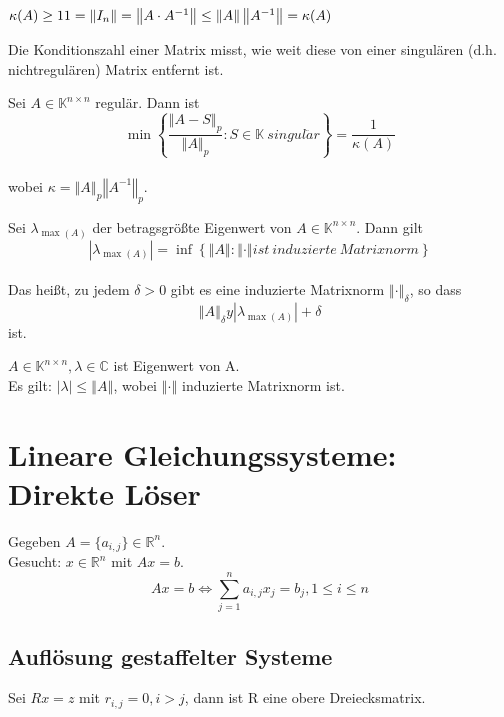 \documentclass[a4paper,10pt]{scrartcl}
\newcommand{\norm}[1]{ \left\Vert #1 \right\Vert }
\newtheorem[L]{satz}{Satz}[section]
\newtheorem[S]{beweis}{Beweis}
\newtheorem[S]{beh}{Behauptung}
\begin{document}
\begin{beh}
 $\kappa(A) \geq 1\\
1 = \norm{I_n} = \norm{A \cdot A^{-1}} \leq \norm{A}\norm{A^{-1}} = \kappa(A)$
\end{beh}
Die Konditionszahl einer Matrix misst, wie weit diese von einer singulären (d.h. nichtregulären) Matrix entfernt ist.\\
\begin{satz}
 Sei $A \in \mathbb{K}^{n\times n}$ regulär. Dann ist
$$\min \left\{\frac{\norm{A - S}_p}{\norm{A}_p} : S \in \mathbb{K}~ singul\ddot{a}r\right\} = \frac{1}{\kappa(A)}$$\\
wobei $\kappa = \norm{A}_p \norm{A^{-1}}_p$.
\end{satz}

\begin{satz}
 Sei $\lambda_{\max{(A)}}$ der betragsgrößte Eigenwert von $A \in \mathbb{K}^{n \times n}$. Dann gilt\\ 
$$ | \lambda_{\max(A)}|  = \inf\left\{\norm{A} : \norm{\cdot} ist~induzierte~Matrixnorm\right\}$$\\
Das heißt, zu jedem $\delta > 0$ gibt es eine induzierte Matrixnorm $\norm{\cdot}_\delta$, so dass $$ \norm{A}_{\delta} y  | \lambda_{\max{(A)}} | + \delta$$
ist.
\end{satz}


$A \in \mathbb{K}^{n \times n}, \lambda \in \mathbb{C}$ ist Eigenwert von A.\\
Es gilt: $ | \lambda | \leq \norm{A}$, wobei $\norm{\cdot}$ induzierte Matrixnorm ist.
\newpage

\section{Lineare Gleichungssysteme: Direkte Löser}
Gegeben $A = \{a_{i,j}\} \in \mathbb{R}^n$.\\
Gesucht: $x \in \mathbb{R}^n$ mit $Ax = b$.
\begin{equation} \label{eq:lgs}
 Ax = b \Leftrightarrow \sum\limits_{j = 1}^n a_{i,j}x_j = b_j, 1 \leq i\leq n 
\end{equation}


\subsection{Auflösung gestaffelter Systeme}
Sei $Rx = z$ mit $r_{i,j} = 0, i > j$, dann ist R eine obere Dreiecksmatrix.\\
\end{document}
